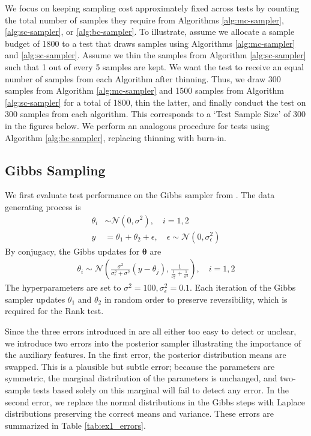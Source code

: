 \documentclass[a4paper,11pt]{article}
\begin{document}
We focus on keeping sampling cost approximately fixed across tests by counting the total number of samples they require from Algorithms \ref{alg:mc-sampler}, \ref{alg:sc-sampler}, or \ref{alg:bc-sampler}. To illustrate, assume we allocate a sample budget of 1800 to a test that draws samples using Algorithms \ref{alg:mc-sampler} and \ref{alg:sc-sampler}. Assume we thin the samples from Algorithm \ref{alg:sc-sampler} such that 1 out of every 5 samples are kept. We want the test to receive an equal number of samples from each Algorithm after thinning. Thus, we draw 300 samples from Algorithm \ref{alg:mc-sampler} and 1500 samples from Algorithm \ref{alg:sc-sampler} for a total of 1800, thin the latter, and finally conduct the test on 300 samples from each algorithm. This corresponds to a `Test Sample Size' of 300 in the figures below. We perform an analogous procedure for tests using Algorithm \ref{alg:bc-sampler}, replacing thinning with burn-in.

\subsection{Gibbs Sampling}
We first evaluate test performance on the Gibbs sampler from \cite{gandy_unit_2020}. The data generating process is
\begin{align}
    \theta_i &\sim \mathcal{N}(0, \sigma^2), \quad i=1,2 \\
    y &= \theta_1 + \theta_2 + \epsilon, \quad \epsilon \sim \mathcal{N}(0, \sigma_\epsilon^2)
\end{align}
By conjugacy, the Gibbs updates for $\mathbf{\theta}$ are
\begin{align}
\theta_{i} \sim \mathcal{N}\left(
\frac{\sigma^{2}}{\sigma_{\epsilon}^{2}+\sigma^{2}}\left(y-\theta_{j}\right)
, \frac{1}{\frac{1}{\sigma_{\epsilon}^{2}}+\frac{1}{\sigma^{2}}}\right), \quad i=1,2
\end{align}
The hyperparameters are set to $\sigma^{2}=100, \sigma_{\epsilon}^{2}=0.1$. Each iteration of the Gibbs sampler updates $\theta_{1}$ and $\theta_{2}$ in random order to preserve reversibility, which is required for the Rank test.

Since the three errors introduced in \cite{gandy_unit_2020} are all either too easy to detect or unclear, we introduce two errors into the posterior sampler illustrating the importance of the auxiliary features. In the first error, the posterior distribution means are swapped. This is a plausible but subtle error; because the parameters are symmetric, the marginal distribution of the parameters is unchanged, and two-sample tests based solely on this marginal will fail to detect any error. In the second error, we replace the normal distributions in the Gibbs steps with Laplace distributions preserving the correct means and variance. These errors are summarized in Table \ref{tab:ex1_errors}.
\end{document}
